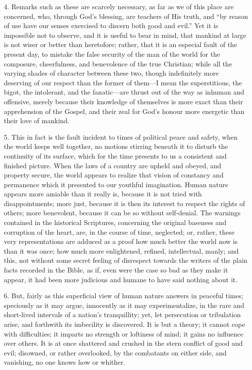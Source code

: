 4. Remarks such as these are scarcely necessary, as far as we of
this place are concerned, who, through God's blessing, are teachers of
His truth, and ``by reason of use have our senses exercised to
discern both good and evil.'' Yet it is impossible not to observe,
and it is useful to bear in mind, that mankind at large is not wiser
or better than heretofore; rather, that it is an especial fault of the
present day, to mistake the false security of the man of the world for
the composure, cheerfulness, and benevolence of the true Christian;
while all the varying shades of character between these two, though
indefinitely more deserving of our respect than the former of them—I
mean the superstitious, the bigot, the intolerant, and the fanatic—are
thrust out of the way as inhuman and offensive, merely because their
knowledge of themselves is more exact than their apprehension of the
Gospel, and their zeal for God's honour more energetic than their love
of mankind.

5. This in fact is the fault incident to times of political peace
and safety, when the world keeps well together, no motions stirring
beneath it to disturb the continuity of its surface, which for the
time presents to us a consistent and finished picture. When the laws
of a country are upheld and obeyed, and property secure, the world
appears to realize that vision of constancy and permanence which it
presented to our youthful imagination. Human nature appears more
amiable than it really is, because it is not tried with
disappointments; more just, because it is then its interest to respect
the rights of others; more benevolent, because it can be so without
self-denial. The warnings contained in the historical Scriptures,
concerning the original baseness and corruption of the heart, are, in
the course of time, neglected; or, rather, these very representations
are adduced as a proof how much better the world now is than it was
once; how much more enlightened, refined, intellectual, manly; and
this, not without some secret feeling of disrespect towards the
writers of the plain facts recorded in the Bible, as if, even were the
case so bad as they make it appear, it had been more judicious and
humane to have said nothing about it.

6. But, fairly as this superficial view of human nature answers in
peaceful times; speciously as it may argue, innocently as it may
experimentalize, in the rare and short-lived intervals of a nation's
tranquillity; yet, let persecution or tribulation arise, and forthwith
its imbecility is discovered. It is but a theory; it cannot cope with
difficulties; it imparts no strength or loftiness of mind; it gains no
influence over others. It is at once shattered and crushed in the
stern conflict of good and evil; disowned, or rather overlooked, by
the combatants on either side, and vanishing, no one knows how or
whither.

